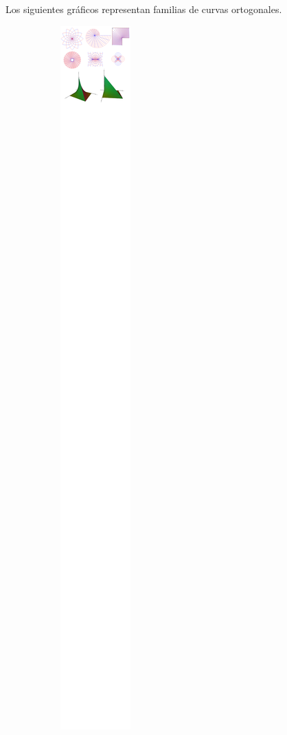 Los siguientes gráficos representan familias de curvas ortogonales.


\begin{figure}[t!]

\centering
\begin{subfigure}[t]{0.5\textwidth}
\centering
\includegraphics[scale=0.4,trim={1px 9876px 670px 20px},clip]{images/04_analisis2/am2.png}

\end{subfigure}
\end{figure}
